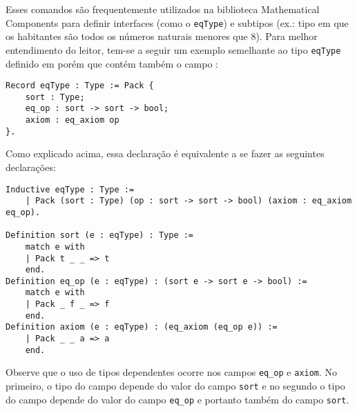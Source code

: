Esses comandos são frequentemente utilizados na biblioteca Mathematical Components para definir interfaces (como o \lstinline[language = coq]$eqType$) e subtipos (ex.: tipo em que os habitantes são todos os números naturais menores que $8$). Para melhor entendimento do leitor, tem-se a seguir um exemplo semelhante ao tipo \lstinline[language = coq]$eqType$ definido em \cite{assia_mahboubi_2022_7118596} porém que contém também o campo :
\begin{lstlisting}[language=coq,frame=single,tabsize=1]
Record eqType : Type := Pack {
    sort : Type;
    eq_op : sort -> sort -> bool;
    axiom : eq_axiom op
}.
\end{lstlisting}
Como explicado acima, essa declaração é equivalente a se fazer as seguintes declarações:
    \begin{lstlisting}[language=coq,frame=single,tabsize=1]
Inductive eqType : Type :=
    | Pack (sort : Type) (op : sort -> sort -> bool) (axiom : eq_axiom eq_op).
    
Definition sort (e : eqType) : Type :=
    match e with
    | Pack t _ _ => t
    end.
Definition eq_op (e : eqType) : (sort e -> sort e -> bool) :=
    match e with
    | Pack _ f _ => f
    end.
Definition axiom (e : eqType) : (eq_axiom (eq_op e)) :=
    | Pack _ _ a => a
    end.
    \end{lstlisting}
Observe que o uso de tipos dependentes ocorre nos campos \lstinline[language = coq]{eq_op} e \lstinline[language = coq]{axiom}. No primeiro, o tipo do campo depende do valor do campo \lstinline[language = coq]{sort} e no segundo o tipo do campo depende do valor do campo \lstinline[language = coq]{eq_op} e portanto também do campo \lstinline[language = coq]{sort}.

